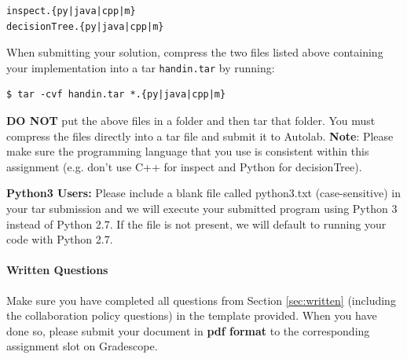 \documentclass[11pt]{article}
\numberwithin{equation}{section} %
\numberwithin{figure}{section} %
\numberwithin{table}{section} %
\begin{document}
\begin{verbatim}
inspect.{py|java|cpp|m}
decisionTree.{py|java|cpp|m}
\end{verbatim}

When submitting your solution, compress the two files listed above containing your implementation into a tar \lstinline{handin.tar} by running:

\begin{lstlisting}[language=Shell]
$ tar -cvf handin.tar *.{py|java|cpp|m} 
\end{lstlisting}

\textbf{DO NOT} put the above files in a folder and then tar that folder. You must compress the files directly into a  tar file and submit it to Autolab. 
%
\textbf{Note}: Please make sure the programming language that you use is consistent within this assignment (e.g. don't use C++ for inspect and Python for decisionTree).

 \begin{notebox}
  {\bf Python3 Users:} Please include a blank file called python3.txt (case-sensitive) in your tar submission and we will execute your submitted program using Python 3 instead of Python 2.7. If the file is not present, we will default to running your code with Python 2.7.
 \end{notebox} 

\paragraph{Written Questions}
Make sure you have completed all questions from Section \ref{sec:written} (including the collaboration policy questions) in the template provided.  When you have done so, please submit your document in \textbf{pdf format} to the corresponding assignment slot on Gradescope.



\newpage
% 
\end{document}
